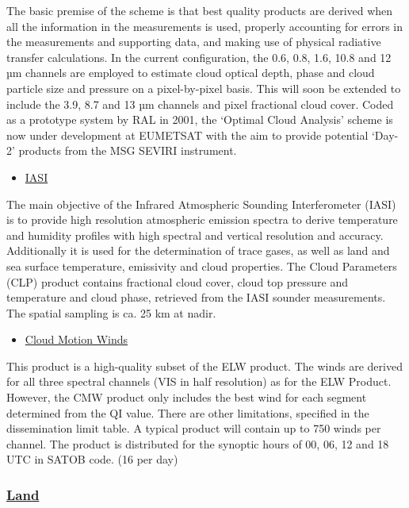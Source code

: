 \documentclass[11pt]{article}
\begin{document}
The basic premise of the scheme is that best quality products are
derived when all the information in the measurements is used,
properly accounting for errors in the measurements and supporting
data, and making use of physical radiative transfer
calculations. In the current configuration, the 0.6, 0.8, 1.6,
10.8 and 12 µm channels are employed to estimate cloud optical
depth, phase and cloud particle size and pressure on a
pixel-by-pixel basis. This will soon be extended to include the
3.9, 8.7 and 13 µm channels and pixel fractional cloud
cover. Coded as a prototype system by RAL in 2001, the `Optimal
Cloud Analysis' scheme is now under development at EUMETSAT with
the aim to provide potential `Day-2' products from the MSG SEVIRI
instrument.

\begin{itemize}
\item \href{http://smsc.cnes.fr/IASI/}{IASI}
\end{itemize}

The main objective of the Infrared Atmospheric Sounding
Interferometer (IASI) is to provide high resolution atmospheric
emission spectra to derive temperature and humidity profiles with
high spectral and vertical resolution and accuracy. Additionally
it is used for the determination of trace gases, as well as land
and sea surface temperature, emissivity and cloud properties. The
Cloud Parameters (CLP) product contains fractional cloud cover,
cloud top pressure and temperature and cloud phase, retrieved from
the IASI sounder measurements. The spatial sampling is ca. 25 km
at nadir. 

\begin{itemize}
\item \href{http://navigator.eumetsat.int/discovery/Query/Detail.do?fileIdentifier=EO%253AEUM%253ADAT%253AMFG%253ACMW1&pageId=brief_BROWSER_QUERY_FRAME&history=catalogHistory}{Cloud Motion Winds}
\end{itemize}

This product is a high-quality subset of the ELW product. The
winds are derived for all three spectral channels (VIS in half
resolution) as for the ELW Product. However, the CMW product only
includes the best wind for each segment determined from the QI
value. There are other limitations, specified in the dissemination
limit table. A typical product will contain up to 750 winds per
channel. The product is distributed for the synoptic hours of 00,
06, 12 and 18 UTC in SATOB code. (16 per day)

\subsubsection{\href{http://www.eumetsat.int/Home/Main/DataProducts/Land/index.htm?l=en}{Land}}
\label{sec-1-6-2}
\end{document}
